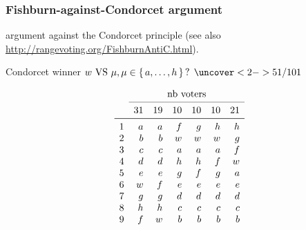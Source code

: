 \documentclass[english]{beamer}
\begin{document}
\begin{frame}[fragile]
	\frametitle{Fishburn-against-Condorcet argument}
	
	\begin{minipage}{5.5cm}
		\citet[p. 544]{fishburn_paradoxes_1974} argument against the Condorcet principle (see also \url{http://rangevoting.org/FishburnAntiC.html}).
		\begin{block}{Condorcet winner}
			$w \text{ VS } \mu, \mu \in \set{a, \ldots, h}\text{? }\uncover<2->{51/101}$
		\end{block}
	\end{minipage}%
	\begin{minipage}{\columnwidth-5cm}
		\small
		\begin{equation}
			\begin{array}{lrrrrrr}
				&\multicolumn{6}{c}{\text{nb voters}}\\
			\cmidrule{2-7}
					&31	&19	&10	&10	&10	&21	\\
			\midrule
				1	&a	&a	&f	&g	&h	&h	\\
				2	&b	&b	&w	&w	&w	&g	\\
				3	&c	&c	&a	&a	&a	&f	\\
				4	&d	&d	&h	&h	&f	&w	\\
				5	&e	&e	&g	&f	&g	&a	\\
				6	&w	&f	&e	&e	&e	&e	\\
				7	&g	&g	&d	&d	&d	&d	\\
				8	&h	&h	&c	&c	&c	&c	\\
				9	&f	&w	&b	&b	&b	&b	\\
			\end{array}
		\end{equation}

\end{minipage}
\end{frame}
\end{document}
